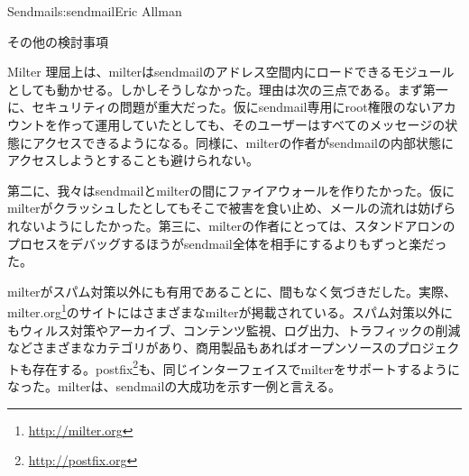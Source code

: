 \begin{aosachapter}{Sendmail}{s:sendmail}{Eric Allman}
\begin{aosasect1}{その他の検討事項}
\begin{aosasect2}{Milter}
理屈上は、milterはsendmailのアドレス空間内にロードできるモジュールとしても動かせる。しかしそうしなかった。理由は次の三点である。まず第一に、セキュリティの問題が重大だった。仮にsendmail専用にroot権限のないアカウントを作って運用していたとしても、そのユーザーはすべてのメッセージの状態にアクセスできるようになる。同様に、milterの作者がsendmailの内部状態にアクセスしようとすることも避けられない。

第二に、我々はsendmailとmilterの間にファイアウォールを作りたかった。仮にmilterがクラッシュしたとしてもそこで被害を食い止め、メールの流れは妨げられないようにしたかった。第三に、milterの作者にとっては、スタンドアロンのプロセスをデバッグするほうがsendmail全体を相手にするよりもずっと楽だった。

milterがスパム対策以外にも有用であることに、間もなく気づきだした。実際、milter.org\footnote{\url{http://milter.org}}のサイトにはさまざまなmilterが掲載されている。スパム対策以外にもウィルス対策やアーカイブ、コンテンツ監視、ログ出力、トラフィックの削減などさまざまなカテゴリがあり、商用製品もあればオープンソースのプロジェクトも存在する。postfix\footnote{\url{http://postfix.org}}も、同じインターフェイスでmilterをサポートするようになった。milterは、sendmailの大成功を示す一例と言える。
\end{aosasect2}


\end{aosasect1}
\end{aosachapter}
